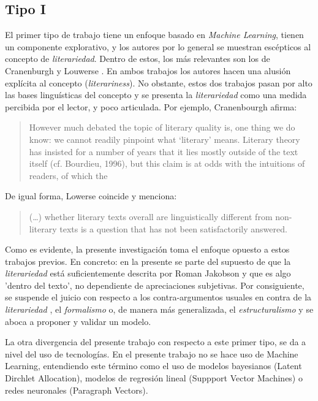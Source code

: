 \documentclass[12pt,letterpaper,twoside]{article}
\begin{document}
\subsection{Tipo I}
\label{sec:org8056997}
El primer tipo de trabajo tiene un enfoque basado en \emph{Machine
Learning}, tienen un componente explorativo, y los autores por lo
general se muestran escépticos al concepto de \emph{literariedad}. Dentro
de estos, los más relevantes son los de Cranenburgh
\cite{van2019vector} \cite{van2015identifying} y Louwerse
\cite{louwerse2008computationally}. En ambos trabajos los autores
hacen una alusión explícita al concepto (\emph{literariness}). No obstante,
estos dos trabajos pasan por alto las bases linguísticas del concepto
y se presenta la \emph{literariedad} como una medida percibida por el
lector, y poco articulada. Por ejemplo, Cranenbourgh afirma:

\begin{quote}
However much debated the topic of literary quality is, one thing we do
know: we cannot readily pinpoint what ‘literary’ means. Literary
theory has insisted for a number of years that it lies mostly outside
of the text itself (cf. Bourdieu, 1996), but this claim is at odds
with the intuitions of readers, of which the
\cite[pg. 58]{van2015identifying}
\end{quote}


De igual forma, Lowerse coincide y menciona:


\begin{quote}
(\ldots{}) whether literary texts overall are linguistically different from
non-literary texts is a question that has not been satisfactorily
answered.\cite[pg. 176]{louwerse2008computationally}
\end{quote}

Como es evidente, la presente investigación toma el enfoque opuesto a
estos trabajos previos. En concreto: en la presente se parte del
supuesto de que la \emph{literariedad} está suficientemente descrita por
Roman Jakobson y que es algo 'dentro del texto', no dependiente de
apreciaciones subjetivas. Por consiguiente, se suspende el juicio con
respecto a los contra-argumentos usuales en contra de la
\emph{literariedad} \cite{chuit2019epistemologia}, el \emph{formalismo} o, de
manera más generalizada, el \emph{estructuralismo} y se aboca a proponer y
validar un modelo.

La otra divergencia del presente trabajo con respecto a este primer
tipo, se da a nivel del uso de tecnologías. En el presente trabajo no
se hace uso de Machine Learning, entendiendo este término como el uso
de modelos bayesianos (Latent Dirchlet Allocation), modelos de
regresión lineal (Suppport Vector Machines) o redes neuronales
(Paragraph Vectors).
\end{document}
